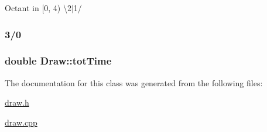 Octant in \mbox{[}0, 4) \textbackslash{}2$\vert$1/ \subsubsection*{3/0 }

\subsubsection[{\texorpdfstring{tot\+Time}{totTime}}]{\setlength{\rightskip}{0pt plus 5cm}double Draw\+::tot\+Time}\hypertarget{classDraw_aca821acc8a6745c5ef690ab84f65be7f}{}\label{classDraw_aca821acc8a6745c5ef690ab84f65be7f}


The documentation for this class was generated from the following files\+:\begin{DoxyCompactItemize}
\item 
\hyperlink{draw_8h}{draw.\+h}\item 
\hyperlink{draw_8cpp}{draw.\+cpp}\end{DoxyCompactItemize}
